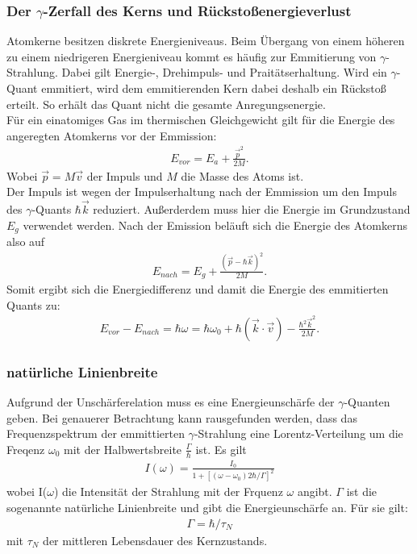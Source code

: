 \documentclass[a4paper,twoside,final]{article}
\begin{document}
\subsubsection{Der $\gamma$-Zerfall des Kerns und Rückstoßenergieverlust}\label{sec:Rückstoß}
Atomkerne besitzen diskrete Energieniveaus. Beim Übergang von einem höheren zu einem niedrigeren Energieniveau kommt es häufig zur Emmitierung von $\gamma$-Strahlung. Dabei gilt Energie-, Drehimpuls- und Praitätserhaltung. Wird ein $\gamma$-Quant emmitiert, wird dem emmitierenden Kern dabei deshalb ein Rückstoß erteilt. So erhält das Quant nicht die gesamte Anregungsenergie. \\
Für ein einatomiges Gas im thermischen Gleichgewicht gilt für die Energie des angeregten Atomkerns vor der Emmission:
\begin{align}
E_{vor} = E_a+\frac{\vec{p}^2}{2M}.
\end{align}
Wobei $\vec{p} = M\vec{v}$ der Impuls und $M$ die Masse des Atoms ist. \\
Der Impuls ist wegen der Impulserhaltung nach der Emmission um den Impuls des $\gamma$-Quants $\hbar\vec{k}$ reduziert. Außerderdem muss hier die Energie im Grundzustand $E_g$ verwendet werden. Nach der Emission beläuft sich die Energie des Atomkerns also auf
\begin{align}
E_{nach} = E_g+\frac{(\vec{p}-\hbar\vec{k})^2}{2M}.
\end{align}
Somit ergibt sich die Energiedifferenz und damit die Energie des emmitierten Quants zu:
\begin{align}\label{equ:EnergieGamma}
E_{vor}-E_{nach}= \hbar \omega = \hbar \omega_0 + \hbar (\vec{k}\cdot\vec{v})-\frac{\hbar^2\vec{k}^2}{2M}.
\end{align}

\subsubsection{natürliche Linienbreite}
Aufgrund der Unschärferelation muss es eine Energieunschärfe der $\gamma$-Quanten geben. Bei genauerer Betrachtung kann rausgefunden werden, dass das Frequenzspektrum der emmittierten $\gamma$-Strahlung eine Lorentz-Verteilung um die Freqenz $\omega_0$ mit der Halbwertsbreite $\frac{\Gamma}{\hbar}$ ist. Es gilt
\begin{align}
I(\omega) = \frac{I_0}{1+[(\omega-\omega_0)2\hbar/\Gamma]^2}
\end{align}
wobei I($\omega$) die Intensität der Strahlung mit der Frquenz $\omega$ angibt.
$\Gamma$ ist die sogenannte natürliche Linienbreite und gibt die Energieunschärfe an. Für sie gilt:
\begin{align}
\Gamma = \hbar / \tau_N
\end{align}
mit $\tau_N$ der mittleren Lebensdauer des Kernzustands.
\end{document}
